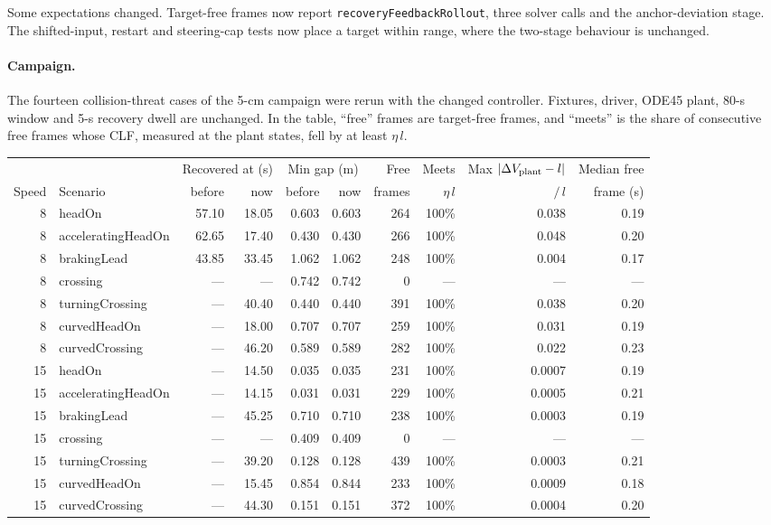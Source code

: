 \documentclass[11pt]{article}
\begin{document}
Some expectations changed. Target-free frames now report
\texttt{recoveryFeedbackRollout}, three solver calls and the
anchor-deviation stage. The shifted-input, restart and steering-cap tests now
place a target within range, where the two-stage behaviour is unchanged.

\paragraph{Campaign.} The fourteen collision-threat cases of the 5-cm campaign
were rerun with the changed controller. Fixtures, driver, ODE45 plant, 80-s
window and 5-s recovery dwell are unchanged. In the table, ``free'' frames are
target-free frames, and ``meets'' is the share of consecutive free frames
whose CLF, measured at the plant states, fell by at least $\eta\,l$.
\begin{center}\footnotesize
\setlength{\tabcolsep}{3pt}
\begin{tabular}{rlrrrrrrrr}
\toprule
 & & \multicolumn{2}{c}{Recovered at (s)} & \multicolumn{2}{c}{Min gap (m)} & Free & Meets & Max $|\Delta V_{\rm plant}-l|$ & Median free\\
Speed & Scenario & before & now & before & now & frames & $\eta\,l$ & $/\,l$ & frame (s)\\
\midrule
8 & headOn & 57.10 & 18.05 & 0.603 & 0.603 & 264 & 100\% & 0.038 & 0.19\\
8 & acceleratingHeadOn & 62.65 & 17.40 & 0.430 & 0.430 & 266 & 100\% & 0.048 & 0.20\\
8 & brakingLead & 43.85 & 33.45 & 1.062 & 1.062 & 248 & 100\% & 0.004 & 0.17\\
8 & crossing & --- & --- & 0.742 & 0.742 & 0 & --- & --- & ---\\
8 & turningCrossing & --- & 40.40 & 0.440 & 0.440 & 391 & 100\% & 0.038 & 0.20\\
8 & curvedHeadOn & --- & 18.00 & 0.707 & 0.707 & 259 & 100\% & 0.031 & 0.19\\
8 & curvedCrossing & --- & 46.20 & 0.589 & 0.589 & 282 & 100\% & 0.022 & 0.23\\
15 & headOn & --- & 14.50 & 0.035 & 0.035 & 231 & 100\% & 0.0007 & 0.19\\
15 & acceleratingHeadOn & --- & 14.15 & 0.031 & 0.031 & 229 & 100\% & 0.0005 & 0.21\\
15 & brakingLead & --- & 45.25 & 0.710 & 0.710 & 238 & 100\% & 0.0003 & 0.19\\
15 & crossing & --- & --- & 0.409 & 0.409 & 0 & --- & --- & ---\\
15 & turningCrossing & --- & 39.20 & 0.128 & 0.128 & 439 & 100\% & 0.0003 & 0.21\\
15 & curvedHeadOn & --- & 15.45 & 0.854 & 0.844 & 233 & 100\% & 0.0009 & 0.18\\
15 & curvedCrossing & --- & 44.30 & 0.151 & 0.151 & 372 & 100\% & 0.0004 & 0.20\\
\bottomrule
\end{tabular}
\end{center}
\end{document}
